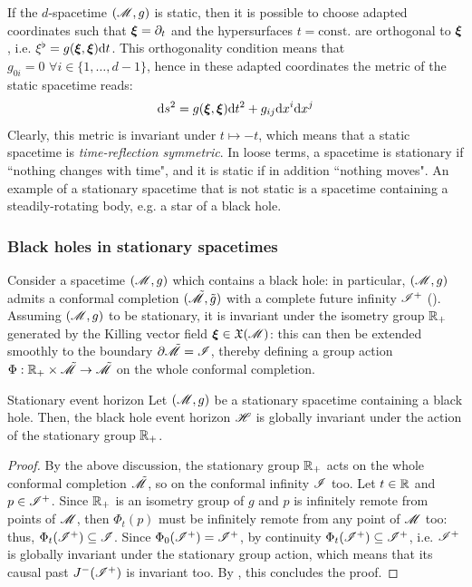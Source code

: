 If the $ d $-spacetime $ (\mathscr{M} , g) $ is static, then it is possible to choose adapted coordinates such that $ \boldsymbol{\xi} = \partial_t $ and the hypersurfaces $ t = \text{const.} $ are orthogonal to $ \boldsymbol{\xi} $, i.e. $ \xi^\flat = g(\boldsymbol{\xi} , \boldsymbol{\xi}) \mathrm{d} t $. This orthogonality condition means that $ g_{0i} = 0 \,\,\forall i \in \{1 , \dots , d-1\} $, hence in these adapted coordinates the metric of the static spacetime reads:
\begin{equation}
  \mathrm{d} s^2 = g(\boldsymbol{\xi} , \boldsymbol{\xi}) \mathrm{d} t^2 + g_{ij} \mathrm{d} x^i \mathrm{d} x^j
\end{equation}
Clearly, this metric is invariant under $ t \mapsto -t $, which means that a static spacetime is \emph{time-reflection symmetric}.
In loose terms, a spacetime is stationary if ``nothing changes with time", and it is static if in addition ``nothing moves". An example of a stationary spacetime that is not static is a spacetime containing a steadily-rotating body, e.g. a star of a black hole.

\subsubsection{Black holes in stationary spacetimes}

Consider a spacetime $ (\mathscr{M} , g) $ which contains a black hole: in particular, $ (\mathscr{M} , g) $ admits a conformal completion $ (\tilde{\mathscr{M}} , \tilde{g}) $ with a complete future infinity $ \mathscr{I}^+ $ (). Assuming $ (\mathscr{M} , g) $ to be stationary, it is invariant under the isometry group $ \mathbb{R}_+ $ generated by the Killing vector field $ \boldsymbol{\xi} \in \mathfrak{X}(\mathscr{M}) $: this can then be extended smoothly to the boundary $ \partial \tilde{\mathscr{M}} = \mathscr{I} $, thereby defining a group action $ \Phi : \mathbb{R}_+ \times \tilde{\mathscr{M}} \rightarrow \tilde{\mathscr{M}} $ on the whole conformal completion.

\begin{proposition}{Stationary event horizon}{}
  Let $ (\mathscr{M} , g) $ be a stationary spacetime containing a black hole. Then, the black hole event horizon $ \mathscr{H} $ is globally invariant under the action of the stationary group $ \mathbb{R}_+ $.
\end{proposition}

\begin{proofbox}
  \begin{proof}
    By the above discussion, the stationary group $ \mathbb{R}_+ $ acts on the whole conformal completion $ \tilde{\mathscr{M}} $, so on the conformal infinity $ \mathscr{I} $ too.
    Let $ t \in \mathbb{R} $ and $ p \in \mathscr{I}^+ $. Since $ \mathbb{R}_+ $ is an isometry group of $ g $ and $ p $ is infinitely remote from points of $ \mathscr{M} $, then $ \Phi_t(p) $ must be infinitely remote from any point of $ \mathscr{M} $ too: thus, $ \Phi_t(\mathscr{I}^+) \subseteq \mathscr{I} $. Since $ \Phi_0(\mathscr{I}^+) = \mathscr{I}^+ $, by continuity $ \Phi_t(\mathscr{I}^+) \subseteq \mathscr{I}^+ $, i.e. $ \mathscr{I}^+ $ is globally invariant under the stationary group action, which means that its causal past $ J^-(\mathscr{I}^+) $ is invariant too. By , this concludes the proof.
  \end{proof}
\end{proofbox}

